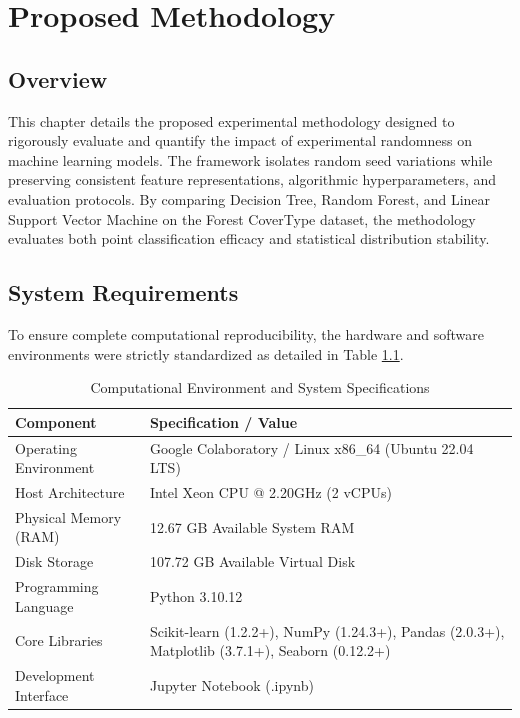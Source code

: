 \chapter{Proposed Methodology}
\label{ch:methodology}

\section{Overview}
\label{sec:method_overview}

This chapter details the proposed experimental methodology designed to rigorously evaluate and quantify the impact of experimental randomness on machine learning models. The framework isolates random seed variations while preserving consistent feature representations, algorithmic hyperparameters, and evaluation protocols. By comparing Decision Tree, Random Forest, and Linear Support Vector Machine on the Forest CoverType dataset, the methodology evaluates both point classification efficacy and statistical distribution stability.

\section{System Requirements}
\label{sec:sys_req}

To ensure complete computational reproducibility, the hardware and software environments were strictly standardized as detailed in Table \ref{tab:system_requirements}.

\begin{table}[H]
\centering
\caption{Computational Environment and System Specifications}
\label{tab:system_requirements}
\begin{tabular}{p{4cm} p{10cm}}
\toprule
\textbf{Component} & \textbf{Specification / Value} \\
\midrule
Operating Environment & Google Colaboratory / Linux x86\_64 (Ubuntu 22.04 LTS) \\
Host Architecture & Intel Xeon CPU @ 2.20GHz (2 vCPUs) \\
Physical Memory (RAM) & 12.67 GB Available System RAM \\
Disk Storage & 107.72 GB Available Virtual Disk \\
Programming Language & Python 3.10.12 \\
Core Libraries & Scikit-learn (1.2.2+), NumPy (1.24.3+), Pandas (2.0.3+), Matplotlib (3.7.1+), Seaborn (0.12.2+) \\
Development Interface & Jupyter Notebook (.ipynb) \\
\bottomrule
\end{tabular}
\end{table}

